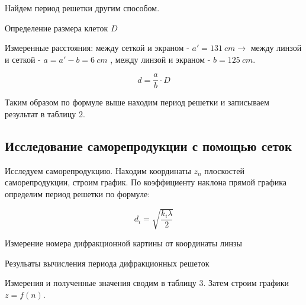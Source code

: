 \documentclass[15pt,a5paper,reqno]{article}
\begin{document}
Найдем период решетки другим способом.
 
\begin{table}[h!]
	\centering
	
	\caption{Определение размера клеток $D$}
	\label{nu1}
\end{table}


Измеренные расстояния: между сеткой и экраном - $a' = 131 \: cm \rightarrow$ между линзой и сеткой -  $a = a' - b = 6 \: cm$ , между линзой и экраном - $ b= 125\:cm$.

\[    d = \frac{a}{b} \cdot D   \]

Таким образом по формуле выше находим период решетки и записываем результат в таблицу 2. 

\newpage

\subsection{Исследование саморепродукции с помощью сеток}

Исследуем саморепродукцию.
Находим координаты $z_n$ плоскостей саморепродукции, строим график. По коэффициенту наклона прямой графика определим период решетки по формуле:

\begin{equation}
  d_i = \sqrt{\frac{k_i\lambda}{2}}
\end{equation}


\begin{table}[h!]
	\centering
	
	\caption{Измерение номера дифракционной картины от координаты линзы}
	\label{nu1}
\end{table}

\begin{table}[h!]
	\centering
	
	\caption{Резульаты вычисления периода дифракционных решеток}
	\label{nu1}
\end{table}

Измерения и полученные значения сводим в таблицу 3. 
Затем строим графики $z = f(n)$.
\end{document}

